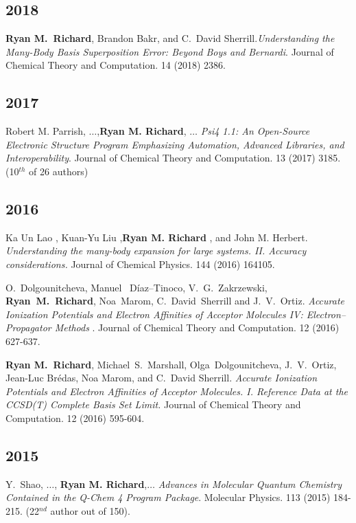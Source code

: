 \documentclass[11pt,a4paper,sans]{moderncv}
\begin{document}
\begin{etaremune}
	\subsection{2018}
	\item{\textbf{Ryan M.~Richard}, Brandon Bakr, and C.~David Sherrill.\emph{Understanding the Many-Body Basis Superposition Error: Beyond Boys and Bernardi}. Journal of Chemical Theory and Computation. 14 (2018) 2386.}
	\subsection{2017}
	\item{Robert M. Parrish, $\ldots$,\textbf{Ryan M. Richard}, $\ldots$ \emph{Psi4 1.1: An Open-Source Electronic Structure Program Emphasizing Automation, Advanced Libraries, and Interoperability}.  Journal of Chemical Theory and Computation. 13 (2017) 3185. (10$^{th}$ of 26 authors)}
	\subsection{2016}
	\item{Ka Un Lao , Kuan-Yu Liu ,\textbf{Ryan M. Richard} , and John M. Herbert. \emph{Understanding the many-body expansion for large systems. II. Accuracy considerations.}  Journal of Chemical Physics.  144 (2016) 164105.}

	\item{O.~Dolgounitcheva, Manuel~ D{\'i}az–Tinoco, V.~G.~Zakrzewski, \textbf{Ryan~M.~Richard}, Noa~Marom, C.~David~Sherrill and J.~V.~Ortiz. \emph{Accurate Ionization Potentials and Electron Affinities
			of Acceptor Molecules {IV}: Electron–Propagator
			Methods
		}.  Journal of Chemical Theory and Computation. 12 (2016) 627-637.}

	\item{\textbf{Ryan M.~Richard}, Michael~S.~Marshall, Olga~Dolgounitcheva, J.~V.~Ortiz, Jean-Luc Br{\' e}das, Noa Marom, and C.~David Sherrill.  \emph{Accurate Ionization Potentials and Electron Affinities of Acceptor Molecules.  {I.} Reference Data at the CCSD(T) Complete Basis Set Limit.}  Journal of Chemical Theory and Computation.  12 (2016) 595-604.}

	\subsection{2015}

	\item{Y.~Shao, $\ldots$, \textbf{Ryan M. Richard},$\ldots$  {\em Advances in Molecular Quantum Chemistry Contained in the Q-Chem 4 Program Package}.  Molecular Physics.  113 (2015) 184-215. (22$^{nd}$ author out of 150).}


\end{etaremune}
\end{document}
